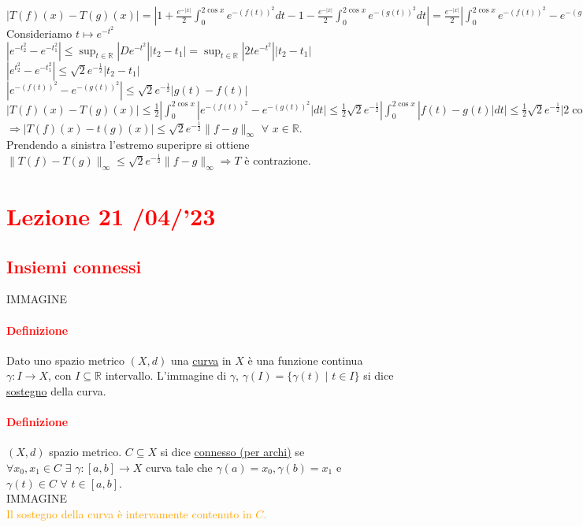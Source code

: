 \documentclass{article}
\newcommand{\R}{\mathbb{R}}
\begin{document}
$|T(f)(x)-T(g)(x)|= |1+\frac{e^{-{|x|}}}{2}\int_{0}^{2\cos x}e^{-(f(t))^2}dt-1-\frac{e^{-{|x|}}}{2}\int_{0}^{2\cos x}e^{-(g(t))^2}dt| = \frac{e^{-|x|}}{2} |\int_{0}^{2\cos x} e^{-(f(t))^2}-e^{-(g(t))^2}dt| \leq \frac{e^{-|x|}}{2} |\int_{0}^{2\cos x} |e^{-(f(t))^2}-e^{-(g(t))^2}| dt| \leq \frac{1}{2} |\int_{0}^{2\cos x}|e^{-(f(t))^2}-e^{-(g(t))^2}|dt| $\\
Consideriamo $ t \mapsto e^{-t^2}$\\
$|e^{-t_2^2}-e^{-t_1^2}| \leq \sup_{t \in \R}|De^{-t^2}||t_2-t_1|= \sup_{t \in \R}|2te^{-t^2}||t_2-t_1|$\\
$|e^{t_2^2}-e^{-t_1^2}|\leq \sqrt{2}e^{-\frac{1}{2}}|t_2-t_1|$\\
$|e^{-(f(t))^2}-e^{-(g(t))^2}|\leq \sqrt{2} e^{-\frac{1}{2}}|g(t)-f(t)| $\\
$ |T(f)(x)-T(g)(x)| \leq \frac{1}{2}|\int_{0}^{2\cos x}|e^{-(f(t))^2}-e^{-(g(t))^2}|dt|\leq \frac{1}{2}\sqrt{2} e^{-\frac{1}{2}}|\int_{0}^{2\cos x}|f(t)-g(t)|dt|\leq \frac{1}{2}\sqrt{2} e^{-\frac{1}{2}} |2 \cos x| \|f-g\|_\infty \leq \sqrt{2} e^{-\frac{1}{2}} \|f-g\|_\infty$\\
$\Rightarrow |T(f)(x)-t(g)(x)|\leq \sqrt{2} e^{-\frac{1}{2}}\| f-g \|_\infty \,\, \forall \,\, x \in \R$.\\
Prendendo a sinistra l'estremo superipre si ottiene $\| T(f)-T(g) \|_\infty \leq \sqrt{2}e^{-\frac{1}{2}}\|f-g\|_\infty \Rightarrow T$ è contrazione.

\newpage
\section{\textcolor{red}{Lezione 21 \space{}/04/'23}}
\subsection{\textcolor{red}{Insiemi connessi}}
IMMAGINE

\paragraph{\textcolor{red}{Definizione}}
Dato uno spazio metrico $(X,d)$ una \underline{curva} in $X$ è una funzione continua $\gamma:I\rightarrow X$, con $I \subseteq \R$ intervallo. L'immagine di $\gamma$, $\gamma(I)=\{\gamma(t)\,\,|\,\, t \in I\}$ si dice \underline{sostegno} della curva.

\paragraph{\textcolor{red}{Definizione}}
$(X,d)$ spazio metrico. $C \subseteq X$ si dice \underline{connesso (per archi)} se $\forall x_0,x_1 \in C \,\, \exists \,\, \gamma:[a,b]\rightarrow X$ curva tale che $\gamma (a)=x_0, \gamma (b) =x_1$ e $\gamma (t)\in C\,\, \forall\,\, t \in [a,b].$\\
IMMAGINE\\
\textcolor{orange}{Il sostegno della curva è intervamente contenuto in $C$.}
\end{document}

